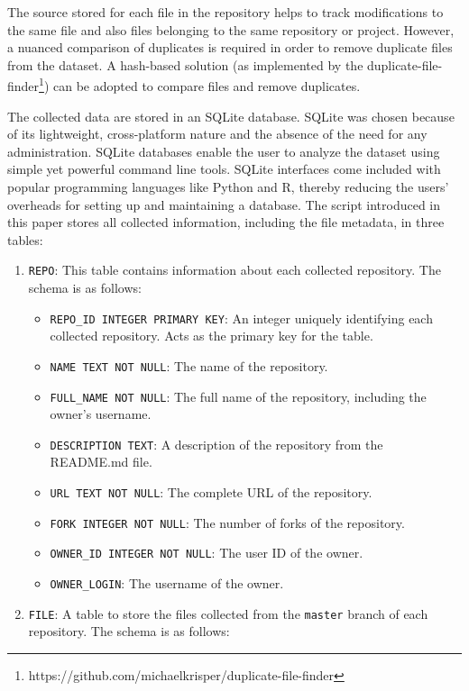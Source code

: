 \documentclass[10pt,conference]{IEEEtran}
\begin{document}
\begin{itemize}
		The source stored for each file in the repository helps to track modifications to the same file and also files belonging to the same repository or project. However, a nuanced comparison of duplicates is required in order to remove duplicate files from the dataset. A hash-based solution (as implemented by the duplicate-file-finder\footnote{https://github.com/michaelkrisper/duplicate-file-finder}) can be adopted to compare files and remove duplicates. 
		
		The collected data are stored in an SQLite database. SQLite was chosen because of its lightweight, cross-platform nature and the absence of the need for any administration. SQLite databases enable the user to analyze the dataset using simple yet powerful command line tools. SQLite interfaces come included with popular programming languages like Python and R, thereby reducing the users' overheads for setting up and maintaining a database. The script introduced in this paper stores all collected information, including the file metadata, in three tables:
		\begin{enumerate}
			\item \texttt{REPO}: This table contains information about each collected repository. The schema is as follows:
			\begin{itemize}
				\item \texttt{REPO\_ID INTEGER PRIMARY KEY}: An integer uniquely identifying each collected repository. Acts as the primary key for the table.
				\item \texttt{NAME TEXT NOT NULL}: The name of the repository.
				\item \texttt{FULL\_NAME NOT NULL}: The full name of the repository, including the owner's username.
				\item \texttt{DESCRIPTION TEXT}: A description of the repository from the README.md file.
				\item \texttt{URL TEXT NOT NULL}: The complete URL of the repository.
				\item \texttt{FORK INTEGER NOT NULL}:  The number of forks of the repository.
				\item \texttt{OWNER\_ID INTEGER NOT NULL}: The user ID of the owner.
				\item \texttt{OWNER\_LOGIN}: The username of the owner.
			\end{itemize}
			\item \texttt{FILE}: A table to store the files collected from the \texttt{master} branch of each repository. The schema is as follows:
			\begin{itemize}

\end{itemize}
\end{enumerate}
\end{itemize}
\end{document}
